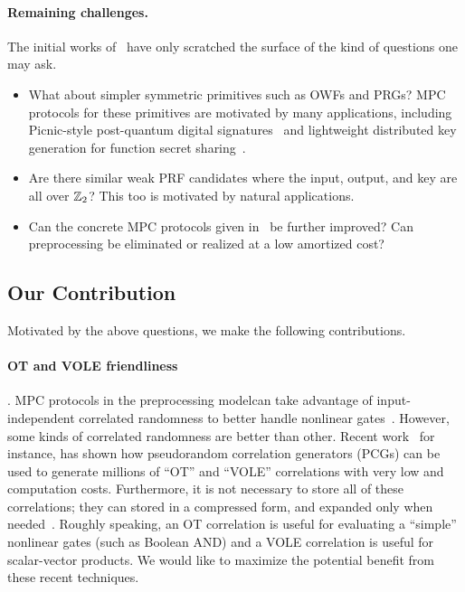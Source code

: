 \paragraph{Remaining challenges.} The initial works of~\cite{boneh2018-darkmatter,adventures} have only scratched the surface of the kind of questions one may ask. 
\begin{itemize}
\item
What about simpler symmetric primitives such as OWFs and PRGs? MPC protocols for these primitives are motivated by many applications, including Picnic-style post-quantum digital signatures~\cite{Picnicrefs} and lightweight distributed key generation for function secret sharing~\cite{Doernershelat,EC20}.
\item Are there similar weak PRF candidates where the input, output, and key are all over $\mathbb{Z}_2$? This too is motivated by natural applications.
\item Can the concrete MPC protocols given in~\cite{boneh2018-darkmatter} be further improved? Can preprocessing be eliminated or realized at a low amortized cost? 
\end{itemize}


\subsection{Our Contribution}


Motivated by the above questions, we make the following contributions.

\iffalse
\paragraph{\bf \textnormal{OT} and \textnormal{VOLE} friendliness}.
    MPC protocols in the preprocessing modelcan take advantage of input-independent correlated randomness to better handle nonlinear gates~\cite{Beaver,BDOZ,SPDZ,PowerOfCorrelatedRandomness,TinyTables,BGI19}. However, some kinds of correlated randomness are better than other. Recent work~\cite{?} for instance, has shown how pseudorandom correlation generators (PCGs) can be used to generate millions of ``OT'' and ``VOLE'' correlations with very low and computation costs. Furthermore, it is not necessary to store all of these correlations; they can stored in a compressed form, and expanded only when needed~\cite{?}. Roughly speaking, an OT correlation is useful for evaluating a ``simple'' nonlinear gates (such as Boolean AND) and a VOLE correlation is useful for scalar-vector products. We would like to maximize the potential benefit from these recent techniques.


